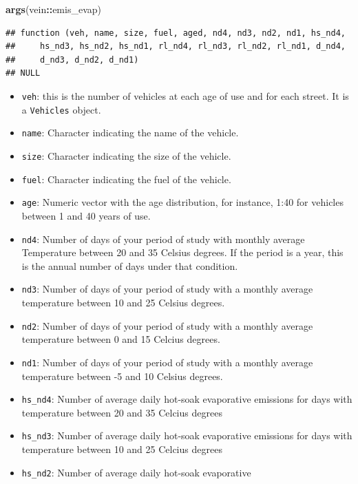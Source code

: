 \documentclass[12pt,graybox,envcountchap,sectrefs]{krantz}
\makeatletter
\newenvironment{Shaded}{\begin{snugshade}}{\end{snugshade}}
\newcommand{\KeywordTok}[1]{\textcolor[rgb]{0.13,0.29,0.53}{\textbf{#1}}}
\newcommand{\OperatorTok}[1]{\textcolor[rgb]{0.81,0.36,0.00}{\textbf{#1}}}
\newcommand{\NormalTok}[1]{#1}
\providecommand{\tightlist}{%
  \setlength{\itemsep}{0pt}\setlength{\parskip}{0pt}}
\newenvironment{kframe}{%
\medskip{}
\setlength{\fboxsep}{.8em}
 \def\at@end@of@kframe{}%
 \ifinner\ifhmode%
  \def\at@end@of@kframe{\end{minipage}}%
  \begin{minipage}{\columnwidth}%
 \fi\fi%
 \def\FrameCommand##1{\hskip\@totalleftmargin \hskip-\fboxsep
 \colorbox{shadecolor}{##1}\hskip-\fboxsep
     \hskip-\linewidth \hskip-\@totalleftmargin \hskip\columnwidth}%
 \MakeFramed {\advance\hsize-\width
   \@totalleftmargin\z@ \linewidth\hsize
   \@setminipage}}%
 {\par\unskip\endMakeFramed%
 \at@end@of@kframe}
\renewenvironment{Shaded}{\begin{kframe}}{\end{kframe}}
\theoremstyle{definition}
\theoremstyle{definition}
\theoremstyle{definition}
\theoremstyle{remark}
\makeatother
\begin{document}
\begin{Shaded}
\begin{Highlighting}[]
\KeywordTok{args}\NormalTok{(vein}\OperatorTok{::}\NormalTok{emis_evap)}
\end{Highlighting}
\end{Shaded}

\begin{verbatim}
## function (veh, name, size, fuel, aged, nd4, nd3, nd2, nd1, hs_nd4, 
##     hs_nd3, hs_nd2, hs_nd1, rl_nd4, rl_nd3, rl_nd2, rl_nd1, d_nd4, 
##     d_nd3, d_nd2, d_nd1) 
## NULL
\end{verbatim}

\begin{itemize}
\tightlist
\item
  \texttt{veh}: this is the number of vehicles at each age of use and
  for each street. It is a \texttt{Vehicles} object.
\item
  \texttt{name}: Character indicating the name of the vehicle.
\item
  \texttt{size}: Character indicating the size of the vehicle.
\item
  \texttt{fuel}: Character indicating the fuel of the vehicle.
\item
  \texttt{age}: Numeric vector with the age distribution, for instance,
  1:40 for vehicles between 1 and 40 years of use.
\item
  \texttt{nd4}: Number of days of your period of study with monthly
  average Temperature between 20 and 35 Celsius degrees. If the period
  is a year, this is the annual number of days under that condition.
\item
  \texttt{nd3}: Number of days of your period of study with a monthly
  average temperature between 10 and 25 Celsius degrees.
\item
  \texttt{nd2}: Number of days of your period of study with a monthly
  average temperature between 0 and 15 Celcius degrees.
\item
  \texttt{nd1}: Number of days of your period of study with a monthly
  average temperature between -5 and 10 Celsius degrees.
\item
  \texttt{hs\_nd4}: Number of average daily hot-soak evaporative
  emissions for days with temperature between 20 and 35 Celcius degrees
\item
  \texttt{hs\_nd3}: Number of average daily hot-soak evaporative
  emissions for days with temperature between 10 and 25 Celcius degrees
\item
  \texttt{hs\_nd2}: Number of average daily hot-soak evaporative

\end{itemize}
\end{document}
